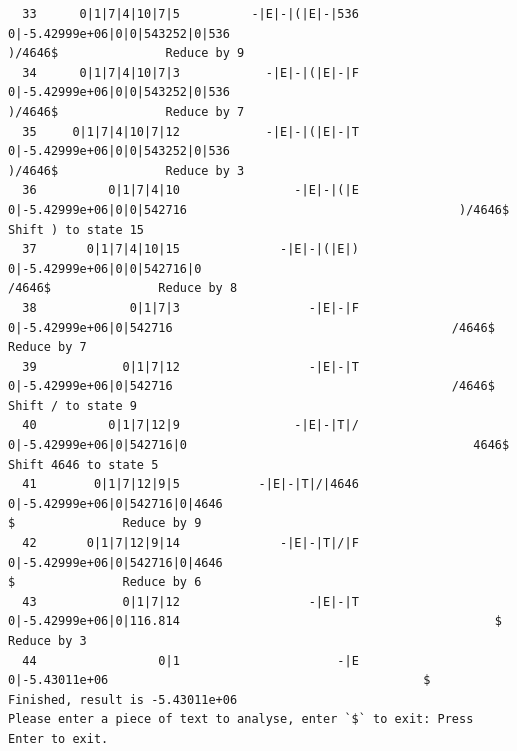 \documentclass[UTF8]{ctexart}
\begin{document}
\begin{lstlisting}
  33      0|1|7|4|10|7|5          -|E|-|(|E|-|536    0|-5.42999e+06|0|0|543252|0|536                                      )/4646$               Reduce by 9
  34      0|1|7|4|10|7|3            -|E|-|(|E|-|F    0|-5.42999e+06|0|0|543252|0|536                                      )/4646$               Reduce by 7
  35     0|1|7|4|10|7|12            -|E|-|(|E|-|T    0|-5.42999e+06|0|0|543252|0|536                                      )/4646$               Reduce by 3
  36          0|1|7|4|10                -|E|-|(|E          0|-5.42999e+06|0|0|542716                                      )/4646$                   Shift ) to state 15
  37       0|1|7|4|10|15              -|E|-|(|E|)        0|-5.42999e+06|0|0|542716|0                                       /4646$               Reduce by 8
  38             0|1|7|3                  -|E|-|F            0|-5.42999e+06|0|542716                                       /4646$               Reduce by 7
  39            0|1|7|12                  -|E|-|T            0|-5.42999e+06|0|542716                                       /4646$                   Shift / to state 9
  40          0|1|7|12|9                -|E|-|T|/          0|-5.42999e+06|0|542716|0                                        4646$                   Shift 4646 to state 5
  41        0|1|7|12|9|5           -|E|-|T|/|4646     0|-5.42999e+06|0|542716|0|4646                                            $               Reduce by 9
  42       0|1|7|12|9|14              -|E|-|T|/|F     0|-5.42999e+06|0|542716|0|4646                                            $               Reduce by 6
  43            0|1|7|12                  -|E|-|T           0|-5.42999e+06|0|116.814                                            $               Reduce by 3
  44                 0|1                      -|E                     0|-5.43011e+06                                            $     Finished, result is -5.43011e+06
Please enter a piece of text to analyse, enter `$` to exit: Press Enter to exit.
    \end{lstlisting}
\end{document}

